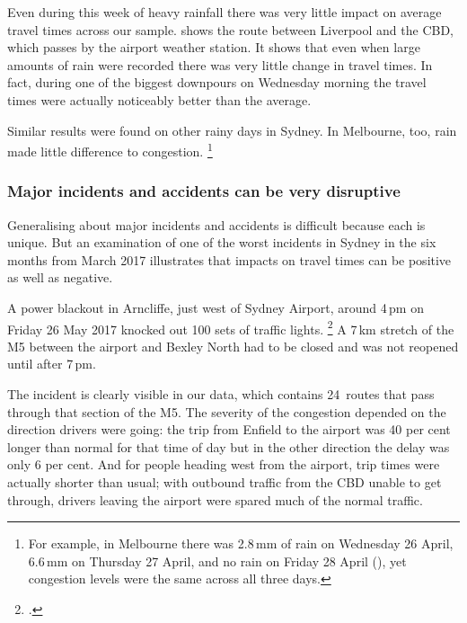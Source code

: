 \documentclass{grattan}
\begin{document}
Even during this week of heavy rainfall there was very little impact on average travel times across our sample.  shows the route between Liverpool and the CBD, which passes by the airport weather station. It shows that even when large amounts of rain were recorded there was very little change in travel times. In fact, during one of the biggest downpours on Wednesday morning the travel times were actually noticeably better than the average.

Similar results were found on other rainy days in Sydney.  In Melbourne, too, rain made little difference to congestion.%
    \footnote{For example, in Melbourne there was 2.8\,mm of rain on Wednesday 26 April, 6.6\,mm on Thursday 27 April, and no rain on Friday 28 April %
    (\textcite{Bom-Data}),
    yet congestion levels were the same across all three days.}

\subsubsection{Major incidents and accidents can be very disruptive}

Generalising about major incidents and accidents is difficult because each is unique.
But an examination of one of the worst incidents in Sydney in the six months from March 2017 illustrates that impacts on travel times can be positive as well as negative.



A power blackout in Arncliffe, just west of Sydney Airport, around 4\,pm on Friday 26 May 2017 knocked out 100 sets of traffic lights.%
  \footcite{ABC-2017-Arncliffe-blackout}
A 7\,km stretch of the M5 between the airport and Bexley North had to be closed and was not reopened until after 7\,pm.

The incident is clearly visible in our data, which contains 24~routes that pass through that section of the M5.
The severity of the congestion depended on the direction drivers were going: the trip from Enfield to the airport was 40 per cent longer than normal for that time of day
but in the other direction the delay was only 6 per cent.
And for people heading west from the airport, trip times were actually shorter than usual; with outbound traffic from the CBD unable to get through, drivers leaving the airport were spared much of the normal traffic.
\end{document}
